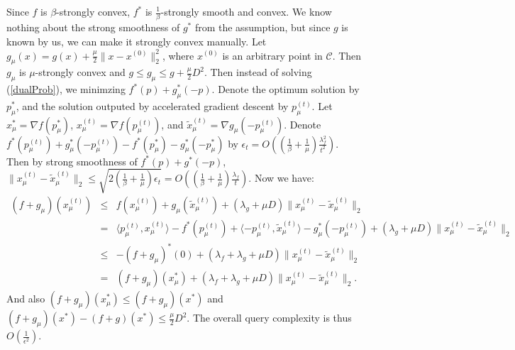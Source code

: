 \documentclass{article}
\begin{document}
Since $f$ is $\beta$-strongly convex, $f^*$ is $\frac{1}{\beta}$-strongly smooth and convex. We know nothing about the strong smoothness of $g^*$ from the assumption, but since $g$ is known by us, we can make it strongly convex manually. Let $g_{\mu}(x)=g(x)+\frac{\mu}{2}\|x-x^{(0)}\|_2^2$, where $x^{(0)}$ is an arbitrary point in $\mathcal{C}$. Then $g_{\mu}$ is $\mu$-strongly convex and $g\le g_{\mu}\le g+\frac{\mu}{2}D^2$. Then instead of solving (\ref{dualProb}), we minimzing $f^*(p)+g_{\mu}^*(-p)$. Denote the optimum solution by $p_{\mu}^*$, and the solution outputed by accelerated gradient descent by $p_{\mu}^{(t)}$. Let $x_{\mu}^*=\nabla f(p_{\mu}^*)$, $x_{\mu}^{(t)}=\nabla f(p_{\mu}^{(t)})$, and $\tilde{x}_{\mu}^{(t)}=\nabla g_{\mu}(-p_{\mu}^{(t)})$. Denote $f^*(p_{\mu}^{(t)})+g_{\mu}^*(-p_{\mu}^{(t)})-f^*(p_{\mu}^*)-g_{\mu}^*(-p_{\mu}^*)$ by $\epsilon_t=O((\frac{1}{\beta}+\frac{1}{\mu})\frac{\lambda_f^2}{t^2})$. Then by strong smoothness of $f^*(p)+g^*(-p)$, $\|x_{\mu}^{(t)}-\tilde{x}_{\mu}^{(t)}\|_2\le\sqrt{2(\frac{1}{\beta}+\frac{1}{\mu})\epsilon_t}=O((\frac{1}{\beta}+\frac{1}{\mu})\frac{\lambda_f}{t})$. Now we have:
\begin{equation}
    \begin{array}{rcl}
        (f+g_{\mu})(x_{\mu}^{(t)}) & \le & f(x_{\mu}^{(t)})+g_{\mu}(\tilde{x}_{\mu}^{(t)})+(\lambda_g+\mu D)\|x_{\mu}^{(t)}-\tilde{x}_{\mu}^{(t)}\|_2 \\
         & = & \langle p_{\mu}^{(t)},x_{\mu}^{(t)}\rangle-f^*(p_{\mu}^{(t)})+\langle -p_{\mu}^{(t)},\tilde{x}_{\mu}^{(t)}\rangle-g_{\mu}^*(-p_{\mu}^{(t)})+(\lambda_g+\mu D)\|x_{\mu}^{(t)}-\tilde{x}_{\mu}^{(t)}\|_2 \\
         & \le & -(f+g_{\mu})^*(0)+(\lambda_f+\lambda_g+\mu D)\|x_{\mu}^{(t)}-\tilde{x}_{\mu}^{(t)}\|_2 \\
         & = & (f+g_{\mu})(x_{\mu}^*)+(\lambda_f+\lambda_g+\mu D)\|x_{\mu}^{(t)}-\tilde{x}_{\mu}^{(t)}\|_2.
    \end{array}
\end{equation}
And also $(f+g_{\mu})(x_{\mu}^*)\le(f+g_{\mu})(x^*)$ and $(f+g_{\mu})(x^*)-(f+g)(x^*)\le \frac{\mu}{2}D^2$. The overall query complexity is thus $O(\frac{1}{\epsilon^2})$.
\end{document}
